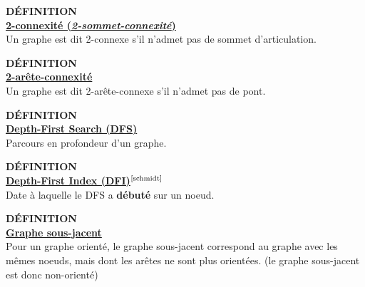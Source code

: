 \documentclass{article}      %
\begin{document}
\begin{definition}
{ \scriptsize \textcolor{definition}{ \textbf{DÉFINITION}}}
\vspace{3px}
\\ \underline{\textbf{2-connexité (\textit{2-sommet-connexité})}}
\vspace{2.5px}
\\ Un graphe est dit 2-connexe s'il n'admet pas de sommet d'articulation.
\end{definition}

\begin{definition}
{ \scriptsize \textcolor{definition}{ \textbf{DÉFINITION}}}
\vspace{3px}
\\ \underline{\textbf{2-arête-connexité}}
\vspace{2.5px}
\\ Un graphe est dit 2-arête-connexe s'il n'admet pas de pont.
\end{definition}

\begin{definition}
{ \scriptsize \textcolor{definition}{ \textbf{DÉFINITION}}}
\vspace{3px}
\\ \underline{\textbf{Depth-First Search (DFS)}}
\vspace{2.5px}
\\ Parcours en profondeur d'un graphe.
\end{definition}

\begin{definition}
{ \scriptsize \textcolor{definition}{ \textbf{DÉFINITION}}}
\vspace{3px}
\\ \underline{\textbf{Depth-First Index (DFI)$^\text{\cite{schmidt}}$}}
\vspace{2.5px}
\\ Date à laquelle le DFS a \textbf{débuté} sur un noeud.
\end{definition}

\begin{definition}
{ \scriptsize \textcolor{definition}{ \textbf{DÉFINITION}}}
\vspace{3px}
\\ \underline{\textbf{Graphe sous-jacent}}
\vspace{2.5px}
\\ Pour un graphe orienté, le graphe sous-jacent correspond au graphe avec les mêmes noeuds, mais dont les arêtes ne sont plus orientées. (le graphe sous-jacent est donc non-orienté)
\end{definition}
\end{document}
